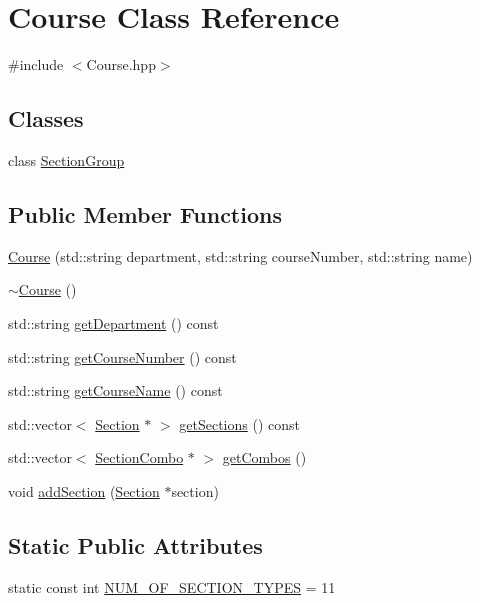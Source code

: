 \hypertarget{class_course}{}\section{Course Class Reference}
\label{class_course}


{\ttfamily \#include $<$Course.\+hpp$>$}

\subsection*{Classes}
\begin{DoxyCompactItemize}
\item 
class \hyperlink{class_course_1_1_section_group}{Section\+Group}
\end{DoxyCompactItemize}
\subsection*{Public Member Functions}
\begin{DoxyCompactItemize}
\item 
\hyperlink{class_course_a835fe2377f1fda0192684040d5e6dae3}{Course} (std\+::string department, std\+::string course\+Number, std\+::string name)
\item 
\hyperlink{class_course_aa9038f2e129526920037dda9e76d69d0}{$\sim$\+Course} ()
\item 
std\+::string \hyperlink{class_course_a4fff69af2ab4979f3e937cd961709f3d}{get\+Department} () const 
\item 
std\+::string \hyperlink{class_course_aa17b3945538988d7ab8fa2eef08cea2a}{get\+Course\+Number} () const 
\item 
std\+::string \hyperlink{class_course_abaca82af3df588e565291af3c875803c}{get\+Course\+Name} () const 
\item 
std\+::vector$<$ \hyperlink{class_section}{Section} $\ast$ $>$ \hyperlink{class_course_ac994a1eeb12bbd0b214497983df2098e}{get\+Sections} () const 
\item 
std\+::vector$<$ \hyperlink{class_section_combo}{Section\+Combo} $\ast$ $>$ \hyperlink{class_course_a085ee7fc0da959d524c723c7bc0a06f1}{get\+Combos} ()
\item 
void \hyperlink{class_course_a7492627dde862812a4d186d2cdc4c04e}{add\+Section} (\hyperlink{class_section}{Section} $\ast$section)
\end{DoxyCompactItemize}
\subsection*{Static Public Attributes}
\begin{DoxyCompactItemize}
\item 
static const int \hyperlink{class_course_a3a9f1f09931aa53d4e7debf51f0cbcb1}{N\+U\+M\+\_\+\+O\+F\+\_\+\+S\+E\+C\+T\+I\+O\+N\+\_\+\+T\+Y\+P\+E\+S} = 11
\end{DoxyCompactItemize}


